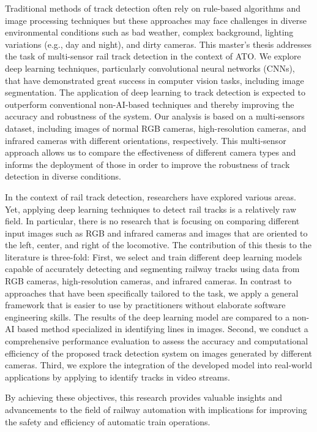 \documentclass[Master,MDS,english]{BASE/twbook} %
\begin{document}
Traditional methods of track detection often rely on rule-based algorithms and image processing techniques but these approaches may face challenges in diverse environmental conditions such as bad weather, complex background, lighting variations (e.g., day and night), and dirty cameras.
This master's thesis addresses the task of multi-sensor rail track detection in the context of ATO. We explore deep learning techniques, particularly convolutional neural networks (CNNs), that have demonstrated great success in computer vision tasks, including image segmentation. The application of deep learning to track detection is expected to outperform conventional non-AI-based techniques and thereby improving the accuracy and robustness of the system.
Our analysis is based on a multi-sensors dataset, including images of normal RGB cameras, high-resolution cameras, and infrared cameras with different orientations, respectively. This multi-sensor approach allows us to compare the effectiveness of different camera types and informs the deployment of those in order to improve the robustness of track detection in diverse conditions. 

In the context of rail track detection, researchers have explored various areas. Yet, applying deep learning techniques to detect rail tracks is a relatively raw field. In particular, there is no research that is focusing on comparing different input images such as RGB and infrared cameras and images that are oriented to the left, center, and right of the locomotive. 
The contribution of this thesis to the literature is three-fold: First, we select and train different deep learning models capable of accurately detecting and segmenting railway tracks using data from RGB cameras, high-resolution cameras, and infrared cameras. In contrast to approaches that have been specifically tailored to the task, we apply a general framework that is easier to use by practitioners without elaborate software engineering skills.
The results of the deep learning model are compared to a non-AI based method specialized in identifying lines in images. 
Second, we conduct a comprehensive performance evaluation to assess the accuracy and computational efficiency of the proposed track detection system on images generated by different cameras.
Third, we explore the integration of the developed model into real-world applications by applying to identify tracks in video streams. 

By achieving these objectives, this research provides valuable insights and advancements to the field of railway automation with implications for improving the safety and efficiency of automatic train operations.
\end{document}
